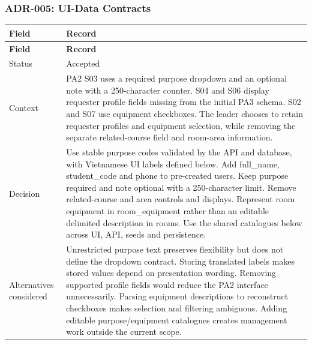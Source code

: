 \vspace{2mm}

\subsubsection{ADR-005: UI-Data Contracts}

\begin{longtable}{|p{}|p{}|}

\hline

\textbf{Field} & \textbf{Record} \\ \hline

\endfirsthead

\hline

\textbf{Field} & \textbf{Record} \\ \hline

\endhead

Status & Accepted \\ \hline

Context & PA2 S03 uses a required purpose dropdown and an optional note with a 250-\allowbreak{}character counter.\allowbreak{} S04 and S06 display requester profile fields missing from the initial PA3 schema.\allowbreak{} S02 and S07 use equipment checkboxes.\allowbreak{} The leader chooses to retain requester profiles and equipment selection, while removing the separate related-\allowbreak{}course field and room-\allowbreak{}area information.\allowbreak{} \\ \hline

Decision & Use stable purpose codes validated by the API and database, with Vietnamese UI labels defined below.\allowbreak{} Add full\_\allowbreak{}name, student\_\allowbreak{}code and phone to pre-\allowbreak{}created users.\allowbreak{} Keep purpose required and note optional with a 250-\allowbreak{}character limit.\allowbreak{} Remove related-\allowbreak{}course and area controls and displays.\allowbreak{} Represent room equipment in room\_\allowbreak{}equipment rather than an editable delimited description in rooms.\allowbreak{} Use the shared catalogues below across UI, API, seeds and persistence.\allowbreak{} \\ \hline

Alternatives considered & Unrestricted purpose text preserves flexibility but does not define the dropdown contract.\allowbreak{} Storing translated labels makes stored values depend on presentation wording.\allowbreak{} Removing supported profile fields would reduce the PA2 interface unnecessarily.\allowbreak{} Parsing equipment descriptions to reconstruct checkboxes makes selection and filtering ambiguous.\allowbreak{} Adding editable purpose/\allowbreak{}equipment catalogues creates management work outside the current scope.\allowbreak{} \\ \hline


\end{longtable}
